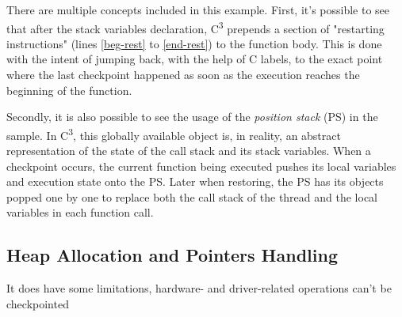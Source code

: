 There are multiple concepts included in this example. First, it's possible to see that after the stack variables declaration, C\textsuperscript{3} prepends a section of "restarting instructions" (lines \ref{beg-rest} to \ref{end-rest}) to the function body. This is done with the intent of jumping back, with the help of C labels, to the exact point where the last checkpoint happened as soon as the execution reaches the beginning of the function. 

Secondly, it is also possible to see the usage of the \textit{position stack} (PS) in the sample. In C\textsuperscript{3}, this globally available object is, in reality, an abstract representation of the state of the call stack and its stack variables. When a checkpoint occurs, the current function being executed pushes its local variables and execution state onto the PS. Later when restoring, the PS has its objects popped one by one to replace both the call stack of the thread and the local variables in each function call. 

\subsection*{Heap Allocation and Pointers Handling}

It does have some limitations, hardware- and driver-related operations can't be checkpointed
